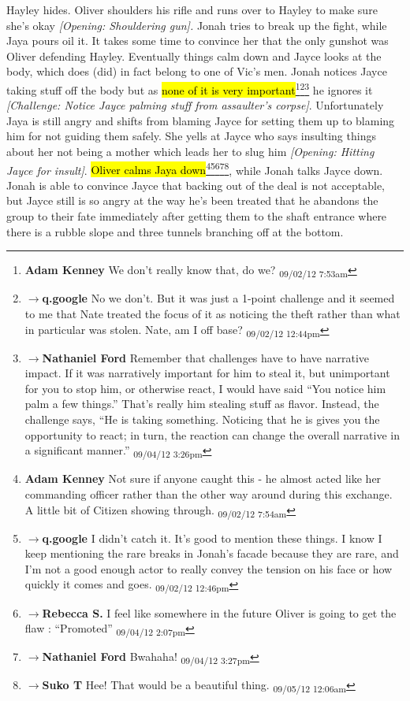 Hayley hides.  Oliver shoulders his rifle and runs over to Hayley to make sure she's okay\textit{ {[}Opening: Shouldering gun{]}.}  Jonah tries to break up the fight, while Jaya pours oil it.  It takes some time to convince her that the only gunshot was Oliver defending Hayley.  Eventually things calm down and Jayce looks at the body, which does (did) in fact belong to one of Vic's men.  Jonah notices Jayce taking stuff off the body but as \hl{none of it is very important}\footnote{\textbf{Adam Kenney }We don't really know that, do we? \textsubscript{09/02/12 7:53am}}\footnote{$\rightarrow$\textbf{q.google }No we don't.  But it was just a 1-point challenge and it seemed to me that Nate treated the focus of it as noticing the theft rather than what in particular was stolen.  Nate, am I off base? \textsubscript{09/02/12 12:44pm}}\footnote{$\rightarrow$\textbf{Nathaniel Ford }Remember that challenges have to have narrative impact. If it was narratively important for him to steal it, but unimportant for you to stop him, or otherwise react, I would have said ``You notice him palm a few things.'' That's really him stealing stuff as flavor. Instead, the challenge  says, ``He is taking something. Noticing that he is gives you the opportunity to react; in turn, the reaction can change the overall narrative in a significant manner.'' \textsubscript{09/04/12 3:26pm}} he ignores it\textit{ {[}Challenge: Notice Jayce palming stuff from assaulter's corpse{]}}.  Unfortunately Jaya is still angry and shifts from blaming Jayce for setting them up to blaming him for not guiding them safely.   She yells at Jayce who says insulting things about her not being a mother which leads her to slug him\textit{ {[}Opening: Hitting Jayce for insult{]}}.   \hl{Oliver calms Jaya down}\footnote{\textbf{Adam Kenney }Not sure if anyone caught this - he almost acted like her commanding officer rather than the other way around during this exchange.  A little bit of Citizen showing through. \textsubscript{09/02/12 7:54am}}\footnote{$\rightarrow$\textbf{q.google }I didn't catch it.  It's good to mention these things.  I know I keep mentioning the rare breaks in Jonah's facade because they are rare, and I'm not a good enough actor to really convey the tension on his face or how quickly it comes and goes. \textsubscript{09/02/12 12:46pm}}\footnote{$\rightarrow$\textbf{Rebecca S. }I feel like somewhere in the future Oliver is going to get the flaw : ``Promoted'' \textsubscript{09/04/12 2:07pm}}\footnote{$\rightarrow$\textbf{Nathaniel Ford }Bwahaha! \textsubscript{09/04/12 3:27pm}}\footnote{$\rightarrow$\textbf{Suko T }Hee!  That would be a beautiful thing. \textsubscript{09/05/12 12:06am}}, while Jonah talks Jayce down.  Jonah is able to convince Jayce that backing out of the deal is not acceptable, but Jayce still is so angry at the way he's been treated that he abandons the group to their fate immediately after getting them to the shaft entrance where there is a rubble slope and three tunnels branching off at the bottom.



